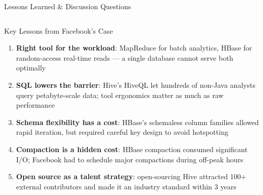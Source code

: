 \documentclass[aspectratio=169,10pt]{beamer}
\begin{document}
\begin{frame}{Lessons Learned \& Discussion Questions}
  \begin{columns}[T]
      \begin{block}{Key Lessons from Facebook's Case}
        \begin{enumerate}
          \item \textbf{Right tool for the workload}: MapReduce for
                batch analytics, HBase for random-access real-time reads —
                a single database cannot serve both optimally
          \item \textbf{SQL lowers the barrier}: Hive's HiveQL let
                hundreds of non-Java analysts query petabyte-scale data;
                tool ergonomics matter as much as raw performance
          \item \textbf{Schema flexibility has a cost}: HBase's schemaless
                column families allowed rapid iteration, but required
                careful key design to avoid hotspotting
          \item \textbf{Compaction is a hidden cost}: HBase compaction
                consumed significant I/O; Facebook had to schedule
                major compactions during off-peak hours
          \item \textbf{Open source as a talent strategy}:
                open-sourcing Hive attracted 100+ external contributors
                and made it an industry standard within 3 years
        \end{enumerate}
      \end{block}


\end{columns}
\end{frame}
\end{document}
